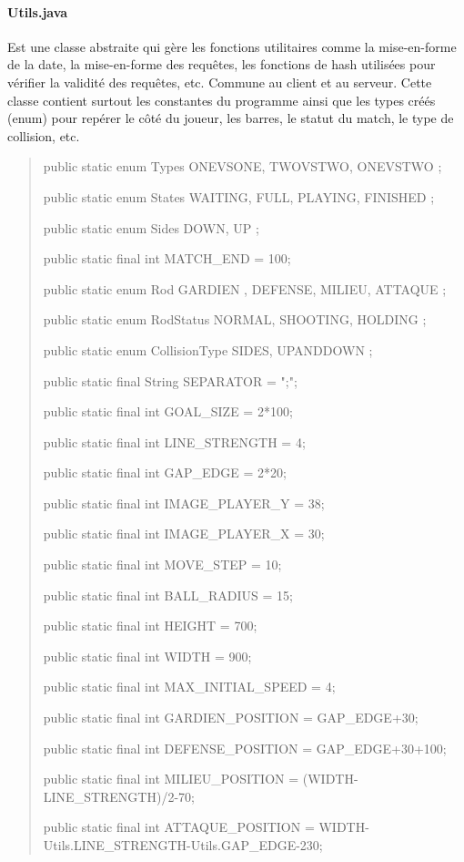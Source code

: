 \documentclass[a4paper,12pt]{report}
\begin{document}
\paragraph{Utils.java}
Est une classe abstraite qui gère les fonctions utilitaires comme la mise-en-forme de la date, la mise-en-forme des requêtes, les fonctions de hash utilisées pour vérifier la validité des requêtes, etc. Commune au client et au serveur. Cette classe contient surtout les constantes du programme ainsi que les types créés (enum) pour repérer le côté du joueur, les barres, le statut du match, le type de collision, etc.
\begin{quote}
	public static enum Types { ONEVSONE, TWOVSTWO, ONEVSTWO };
	
	public static enum States { WAITING, FULL, PLAYING, FINISHED };  
	
	public static enum Sides { DOWN, UP };
	
	
	
	public static final int MATCH\_END = 100;
	
	
	
	public static enum Rod { GARDIEN , DEFENSE, MILIEU, ATTAQUE };
	
	public static enum RodStatus { NORMAL, SHOOTING, HOLDING };  
	
	
	
	public static enum CollisionType { SIDES, UPANDDOWN };
	
	
	
	public static final String SEPARATOR = ";";
	
	
	
	public static final int GOAL\_SIZE = 2*100;
	
	public static final int LINE\_STRENGTH = 4;
	
	public static final int GAP\_EDGE = 2*20;
	
	public static final int IMAGE\_PLAYER\_Y = 38;
	
	public static final int IMAGE\_PLAYER\_X = 30;
	
	public static final int MOVE\_STEP = 10;
	
	public static final int BALL\_RADIUS = 15;
	
	
	
	public static final int HEIGHT = 700;
	
	public static final int WIDTH = 900;



	public static final int MAX\_INITIAL\_SPEED = 4;

	

	public static final int GARDIEN\_POSITION = GAP\_EDGE+30;

	public static final int DEFENSE\_POSITION = GAP\_EDGE+30+100;

	public static final int MILIEU\_POSITION = (WIDTH-LINE\_STRENGTH)/2-70;

	public static final int ATTAQUE\_POSITION = WIDTH-Utils.LINE\_STRENGTH-Utils.GAP\_EDGE-230;
\end{quote}
\end{document}
